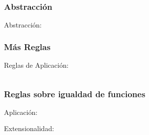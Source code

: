 \documentclass{beamer}
\begin{document}
\begin{frame}\frametitle{Abstracci\'on}
  \pause
  Abstracci\'on:

  \begin{prooftree}
  \end{prooftree}
  

\end{frame}


\begin{frame}\frametitle{M\'as Reglas}
  Reglas de Aplicaci\'on:
  \pause
  \begin{columns}
    \begin{column}{.48\textwidth}

      \begin{prooftree}
      \end{prooftree}
    \end{column}

    \begin{column}{.48\textwidth}

      \begin{prooftree}
      \end{prooftree}
    \end{column}
    
  \end{columns}
\end{frame}

\begin{frame}\frametitle{Reglas sobre igualdad de funciones}
  \pause

  Aplicaci\'on:
  
  \begin{prooftree}
  \end{prooftree}

  \pause
  Extensionalidad:
  
  \begin{prooftree}
  \end{prooftree}
  
\end{frame} 
\end{document}
